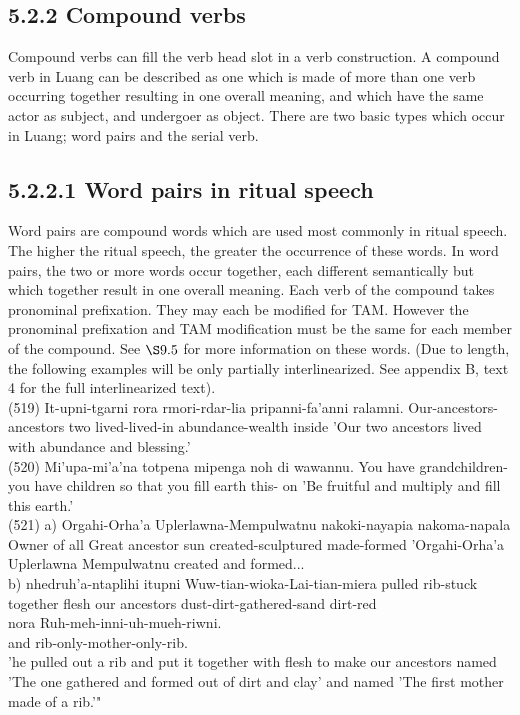 \documentclass[10pt]{article}
\begin{document}
\subsection*{5.2.2 Compound verbs}
Compound verbs can fill the verb head slot in a verb construction. A compound verb in Luang can be described as one which is made of more than one verb occurring together resulting in one overall meaning, and which have the same actor as subject, and undergoer as object. There are two basic types which occur in Luang; word pairs and the serial verb.

\subsection*{5.2.2.1 Word pairs in ritual speech}
Word pairs are compound words which are used most commonly in ritual speech. The higher the ritual speech, the greater the occurrence of these words. In word pairs, the two or more words occur together, each different semantically but which together result in one overall meaning. Each verb of the compound takes pronominal prefixation. They may each be modified for TAM. However the pronominal prefixation and TAM modification must be the same for each member of the compound. See \(\S 9.5\) for more information on these words. (Due to length, the following examples will be only partially interlinearized. See appendix B, text 4 for the full interlinearized text).\\
(519) It-upni-tgarni rora rmori-rdar-lia pripanni-fa'anni ralamni. Our-ancestors-ancestors two lived-lived-in abundance-wealth inside 'Our two ancestors lived with abundance and blessing.'\\
(520) Mi'upa-mi'a'na totpena mipenga noh di wawannu. You have grandchildren-you have children so that you fill earth this- on 'Be fruitful and multiply and fill this earth.'\\
(521) a) Orgahi-Orha'a Uplerlawna-Mempulwatnu nakoki-nayapia nakoma-napala Owner of all Great ancestor sun created-sculptured made-formed 'Orgahi-Orha'a Uplerlawna Mempulwatnu created and formed...\\
b) nhedruh'a-ntaplihi itupni Wuw-tian-wioka-Lai-tian-miera pulled rib-stuck together flesh our ancestors dust-dirt-gathered-sand dirt-red\\
nora Ruh-meh-inni-uh-mueh-riwni.\\
and rib-only-mother-only-rib.\\
'he pulled out a rib and put it together with flesh to make our ancestors named 'The one gathered and formed out of dirt and clay' and named 'The first mother made of a rib.'"
\end{document}
